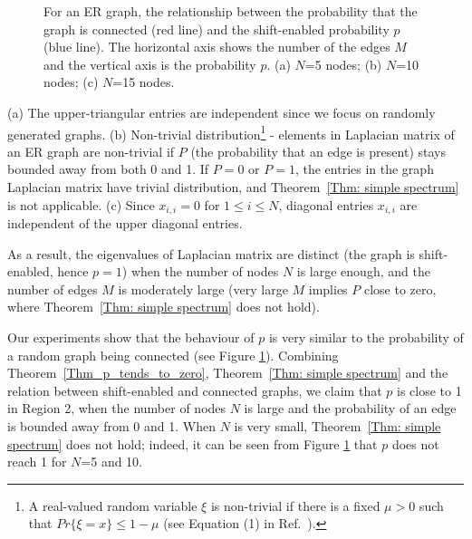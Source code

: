 \documentclass[journal]{IEEEtran}
\begin{document}
\begin{figure}[htb]
	\centering
	\caption{For an ER graph, the relationship between the probability that the graph is connected (red line) and the shift-enabled probability $p$ (blue line). The horizontal axis shows the number of the edges $M$ and the vertical axis is the probability $p$. (a) $N$=5 nodes; (b) $N$=10 nodes; (c) $N$=15 nodes.}
	\label{fig:connectshiftproblapnode5}
\end{figure}

\begin{Rem}\label{remark:upper triangular}
	(a) The upper-triangular entries are independent since we focus on randomly generated graphs. %
	(b) Non-trivial distribution\footnote{A real-valued random variable $\xi$ is non-trivial if there is a fixed $\mu > 0$
such that $Pr\{\xi=x\}\leq 1-\mu$ (see Equation (1) in Ref.~\cite{tao2017random}).} - elements in Laplacian matrix of an ER graph are non-trivial if $P$ (the probability that an edge is present) stays bounded away from both 0 and 1. If $P=0$ or $P=1$, the entries in the graph Laplacian matrix have trivial distribution, and Theorem~\ref{Thm: simple spectrum} is not applicable.
(c) Since $x_{i,i}=0$ for $1\leq i \leq N$, diagonal entries $x_{i,i}$ are independent of the upper diagonal entries.
\end{Rem}
As a result, the eigenvalues of Laplacian matrix are distinct (the graph is shift-enabled, hence $p=1$) when the number of nodes $N$ is large enough, and the number of edges $M$ is moderately large (very large $M$ implies $P$ close to zero, where Theorem~\ref{Thm: simple spectrum} does not hold).

Our experiments show that the behaviour of $p$ is very similar to the probability of a random graph being connected (see Figure  {\ref{fig:connectshiftproblapnode5}}).
Combining Theorem~\ref{Thm_p_tends_to_zero}, Theorem~\ref{Thm: simple spectrum} and the relation between shift-enabled and connected graphs, we claim that $p$ is close to 1 in Region 2, when the number of nodes $N$ is large and the probability of an edge is bounded away from 0 and 1. When $N$ is very small, Theorem~\ref{Thm: simple spectrum} does not hold; indeed, it can be seen from Figure  {\ref{fig:connectshiftproblapnode5}} that $p$ does not reach 1 for $N$=5 and 10. 
\end{document}
